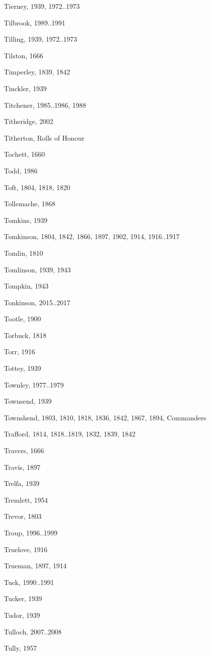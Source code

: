 {\begin{theindex}
\item Tierney, 1939, 1972..1973
\item Tilbrook, 1989..1991
\item Tilling, 1939, 1972..1973
\item Tilston, 1666
\item Timperley, 1839, 1842
\item Tinckler, 1939
\item Titchener, 1985..1986, 1988
\item Titheridge, 2002
\item Titherton, Rolls of Honour
\item Tochett, 1660
\item Todd, 1986
\item Toft, 1804, 1818, 1820
\item Tollemache, 1868
\item Tomkins, 1939
\item Tomkinson, 1804, 1842, 1866, 1897, 1902, 1914, 1916..1917
\item Tomlin, 1810
\item Tomlinson, 1939, 1943
\item Tompkin, 1943
\item Tonkinson, 2015..2017
\item Tootle, 1900
\item Torbuck, 1818
\item Torr, 1916
\item Tottey, 1939
\item Townley, 1977..1979
\item Townsend, 1939
\item Townshend, 1803, 1810, 1818, 1836, 1842, 1867, 1894, Commanders
\item Trafford, 1814, 1818..1819, 1832, 1839, 1842
\item Travers, 1666
\item Travis, 1897
\item Trelfa, 1939
\item Tremlett, 1954
\item Trevor, 1803
\item Troup, 1996..1999
\item Truelove, 1916
\item Trueman, 1897, 1914
\item Tuck, 1990..1991
\item Tucker, 1939
\item Tudor, 1939
\item Tulloch, 2007..2008
\item Tully, 1957

\end{theindex}}
